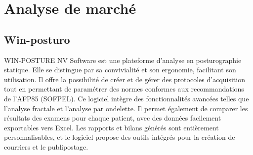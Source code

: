 \section{Analyse de marché}

\subsection{Win-posturo}

WIN-POSTURE NV Software est une plateforme d'analyse en posturographie statique. 
Elle se distingue par sa convivialité et son ergonomie, facilitant son utilisation. 
Il offre la possibilité de créer et de gérer des protocoles d'acquisition tout en permettant de paramétrer des normes conformes aux recommandations de l'AFP85 (SOFPEL). 
Ce logiciel intègre des fonctionnalités avancées telles que l'analyse fractale et l'analyse par ondelette. 
Il permet également de comparer les résultats des examens pour chaque patient, avec des données facilement exportables vers Excel. 
Les rapports et bilans générés sont entièrement personnalisables, et le logiciel propose des outils intégrés pour la création de courriers et le publipostage.

